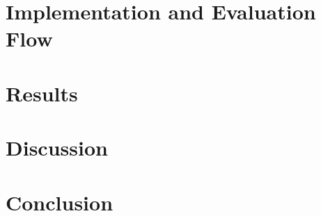 \documentclass[journal,10pt]{IEEEtran}
\begin{document}

\IEEEpeerreviewmaketitle











\section{Implementation and Evaluation Flow}
\label{sec:impl}

\section{Results}
\label{sec:results}



\section{Discussion}
\label{sec:discussion}

\section{Conclusion}
\label{sec:conclusion}





%
\end{document}
